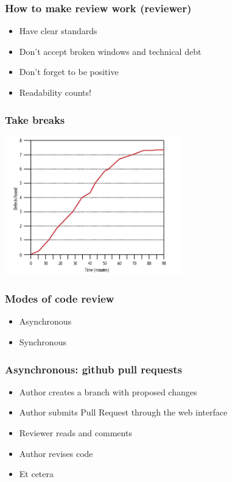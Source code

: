 \documentclass{beamer}
\begin{document}
\begin{frame}
\frametitle{How to make review work (reviewer)}
\begin{itemize}
\pause
\item 
Have clear standards
\pause 
\item 
Don't accept broken windows and technical debt
\pause
\item 
Don't forget to be positive
\pause
\item 
Readability counts! 
\end{itemize}
\end{frame}

\begin{frame}
\frametitle{Take breaks}
\includegraphics[height=6cm]{figures/review_errors}
\end{frame}


\begin{frame}
\frametitle{Modes of code review}
\begin{itemize}
\pause
\item
Asynchronous 
\pause
\item
Synchronous 
\end{itemize}
\end{frame}

\begin{frame}
\frametitle{Asynchronous: github pull requests}
\begin{itemize}
\pause
\item
Author creates a branch with proposed changes 
\pause
\item
Author submits Pull Request through the web interface
\pause
\item
Reviewer reads and comments
\pause
\item
Author revises code
\pause
\item
Et cetera
\end{itemize}
\end{frame}
\end{document}
